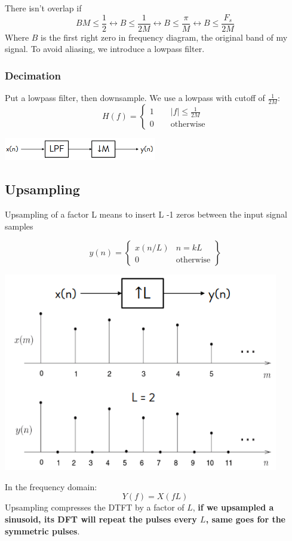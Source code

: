     There isn't overlap if
    $$
    BM\leq \frac{1}{2}\leftrightarrow B\leq\frac{1}{2M}\leftrightarrow B\leq\frac{\pi}{M}\leftrightarrow B\leq\frac{F_s}{2M}
    $$
    Where $B$ is the first right zero in frequency diagram, the original band of my signal. To avoid aliasing, we introduce a lowpass filter.

    \subsubsection{Decimation}
    Put a lowpass filter, then downsample. We use a lowpass with cutoff of $\frac{1}{2M}$:
    $$
    H(f)=\begin{cases}
        1\qquad |f|\leq\frac{1}{2M}\\
        0\qquad\text{otherwise}
    \end{cases}
    $$
    \begin{center}
        \includegraphics[width=0.5\textwidth]{images/downsampling_lpf.png}
    \end{center}

\subsection{Upsampling}
    Upsampling of a factor L means to insert L -1 zeros between the input signal samples
    \begin{LARGE}
        $$
        y(n)=\begin{Bmatrix}
            x(n/L) & n=kL\\
            0 & \text{otherwise}
        \end{Bmatrix}
        $$    
    \end{LARGE}
    \begin{center}
        \includegraphics[width=0.9\textwidth]{images/upsampling.png}
    \end{center}
    In the frequency domain:
    $$
    Y(f)=X(fL)
    $$
    Upsampling compresses the DTFT by a factor of $L$, \textbf{if we upsampled a sinusoid, its DFT will repeat the pulses every $L$, same goes for the symmetric pulses}.


